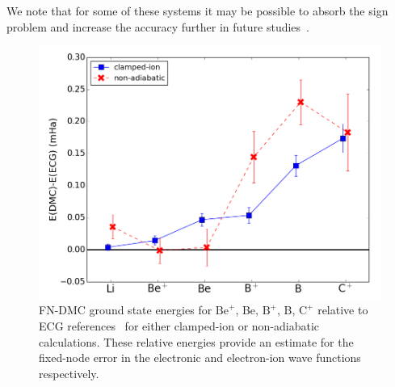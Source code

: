 \documentclass[pra,superscriptaddress,groupedaddress,twocolumn]{revtex4-1}
\begin{document}
We note that for some of these systems it may be possible to absorb the sign problem and increase the accuracy further in future studies~\cite{Tubman_Release,Tubman_ACS}. %

\begin{figure}[h]
\centering
\includegraphics[scale=.37]{Figures/atom-ECG}
\caption{FN-DMC ground state energies for $\text{Be}^+$, Be, $\text{B}^+$, B, $\text{C}^+$ relative to ECG references~\cite{Stanke_Be,Puchalski_Be+,Bubin_BeH_noBO,Bubin_B,Bubin_B+,Bubin_C+} for either clamped-ion or non-adiabatic calculations. These relative energies provide an estimate for the fixed-node error in the electronic and electron-ion wave functions respectively.\label{fig:atom-ECG}}
\end{figure}
\end{document}
